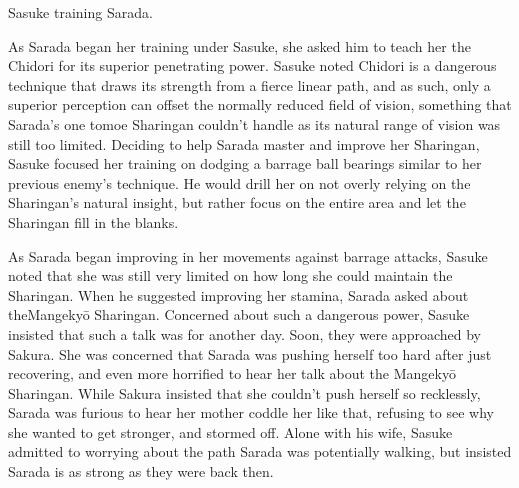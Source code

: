 \documentclass[a4paper,12pt]{article}
\begin{document}
Sasuke training Sarada.\\ \par \vspace{0.5cm}

As Sarada began her training under Sasuke, she asked him to teach her the Chidori for its superior penetrating power. Sasuke noted Chidori is a dangerous technique that draws its strength from a fierce linear path, and as such, only a superior perception can offset the normally reduced field of vision, something that Sarada's one tomoe Sharingan couldn't handle as its natural range of vision was still too limited. Deciding to help Sarada master and improve her Sharingan, Sasuke focused her training on dodging a barrage ball bearings similar to her previous enemy's technique. He would drill her on not overly relying on the Sharingan's natural insight, but rather focus on the entire area and let the Sharingan fill in the blanks.\\ \par \vspace{0.5cm}

As Sarada began improving in her movements against barrage attacks, Sasuke noted that she was still very limited on how long she could maintain the Sharingan. When he suggested improving her stamina, Sarada asked about theMangekyō Sharingan. Concerned about such a dangerous power, Sasuke insisted that such a talk was for another day. Soon, they were approached by Sakura. She was concerned that Sarada was pushing herself too hard after just recovering, and even more horrified to hear her talk about the Mangekyō Sharingan. While Sakura insisted that she couldn't push herself so recklessly, Sarada was furious to hear her mother coddle her like that, refusing to see why she wanted to get stronger, and stormed off. Alone with his wife, Sasuke admitted to worrying about the path Sarada was potentially walking, but insisted Sarada is as strong as they were back then.\\ \par \vspace{0.5cm}
\end{document}
